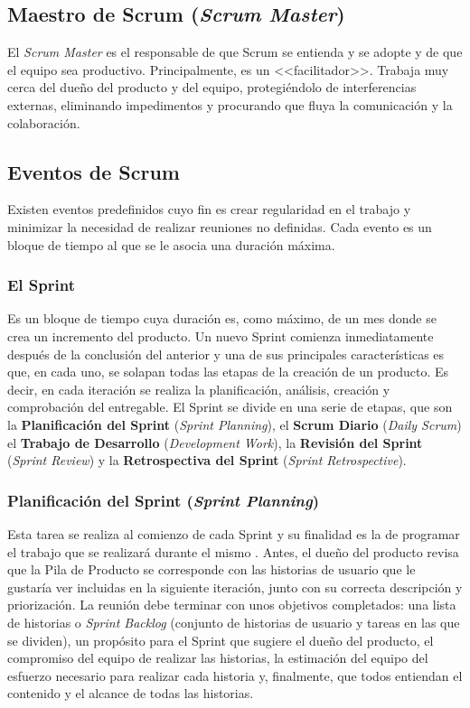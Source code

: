 \subsection*{Maestro de Scrum (\textit{Scrum Master})}
El \textit{Scrum Master} \cite{Gomez2017} es el responsable de que Scrum se entienda y se adopte y de que el equipo sea productivo. Principalmente, es un <<facilitador>>. Trabaja muy cerca del dueño del producto y del equipo, protegiéndolo de interferencias externas, eliminando impedimentos y procurando que fluya la comunicación y la colaboración.

\subsection{Eventos de Scrum}
Existen eventos \cite{Schwaber2017} predefinidos cuyo fin es crear regularidad en el trabajo y minimizar la necesidad de realizar reuniones no definidas. Cada evento es un bloque de tiempo al que se le asocia una duración máxima.

\newpage

\subsubsection{El Sprint}
Es un bloque de tiempo cuya duración es, como máximo, de un mes donde se crea un incremento del producto. Un nuevo Sprint comienza inmediatamente después de la conclusión del anterior y una de sus principales características es que, en cada uno, se solapan todas las etapas de la creación de un producto. Es decir, en cada iteración se realiza la planificación, análisis, creación y comprobación del entregable. El Sprint se divide en una serie de etapas, que son la \textbf{Planificación del Sprint} (\textit{Sprint Planning}), el \textbf{Scrum Diario} (\textit{Daily Scrum}) el \textbf{Trabajo de Desarrollo} (\textit{Development Work}), la \textbf{Revisión del Sprint} (\textit{Sprint Review}) y la \textbf{Retrospectiva del Sprint} (\textit{Sprint Retrospective}).

\subsubsection{Planificación del Sprint (\textit{Sprint Planning})}
Esta tarea se realiza al comienzo de cada Sprint y su finalidad es la de programar el trabajo que se realizará durante el mismo \cite{Gomez2017}. Antes, el dueño del producto revisa que la Pila de Producto se corresponde con las historias de usuario que le gustaría ver incluidas en la siguiente iteración, junto con su correcta descripción y priorización. La reunión debe terminar con unos objetivos completados: una lista de historias o \textit{Sprint Backlog} (conjunto de historias de usuario y tareas en las que se dividen), un propósito para el Sprint que sugiere el dueño del producto, el compromiso del equipo de realizar las historias, la estimación del equipo del esfuerzo necesario para realizar cada historia y, finalmente,  que todos entiendan el contenido y el alcance de todas las historias.

